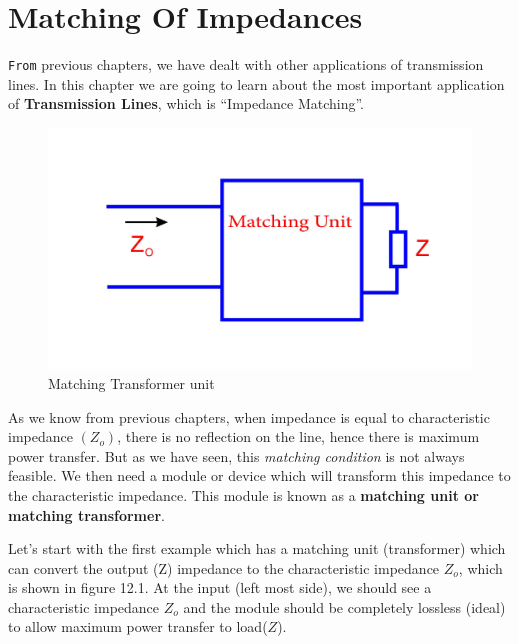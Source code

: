 \chapter{Matching Of Impedances}
\verb|From| previous chapters, we have dealt with other applications of transmission lines. In this chapter we are going to learn about the  most important application of \textbf{Transmission Lines}, which is \textquotedblleft Impedance Matching\textquotedblright.
\begin{figure}[h]
\centering
\includegraphics[width=1\linewidth]{./graphics/fig7}
\caption{Matching Transformer unit}
\end{figure} 

As we know from previous chapters, when impedance is equal to characteristic impedance $(Z_o)$, there is no reflection on the line, hence there is maximum power transfer. But as we have seen, this \textit{matching condition} is not always feasible. We then need a module or device which will transform this impedance to the characteristic impedance. This module  is known as a \textbf{matching unit or matching transformer}. 

Let's start with the first example which has a matching unit (transformer)  which can convert the output (Z) impedance to the characteristic impedance $Z_o$, which is shown in figure 12.1. At the input (left most side), we should see a characteristic impedance $ Z_o$ and the module should be completely lossless (ideal) to allow maximum power transfer to load($Z$).

